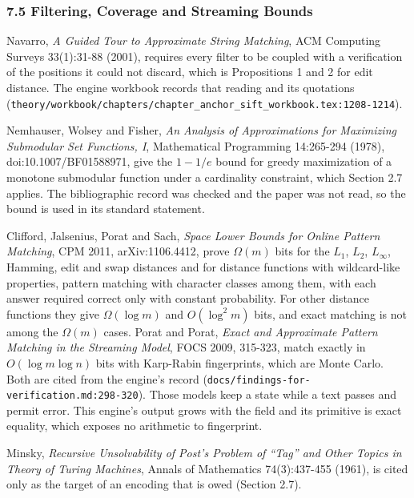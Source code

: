 \subsubsection{7.5 Filtering, Coverage and Streaming Bounds}

Navarro, \emph{A Guided Tour to Approximate String Matching}, ACM Computing Surveys 33(1):31-88 (2001), requires every filter to be coupled with a verification of the positions it could not discard, which is Propositions 1 and 2 for edit distance. The engine workbook records that reading and its quotations (\texttt{theory/\allowbreak{}workbook/\allowbreak{}chapters/\allowbreak{}chapter\_anchor\_sift\_workbook.tex:1208-\allowbreak{}1214}).

Nemhauser, Wolsey and Fisher, \emph{An Analysis of Approximations for Maximizing Submodular Set Functions, I}, Mathematical Programming 14:265-294 (1978), doi:10.1007/BF01588971, give the \(1 - 1/e\) bound for greedy maximization of a monotone submodular function under a cardinality constraint, which Section 2.7 applies. The bibliographic record was checked and the paper was not read, so the bound is used in its standard statement.

Clifford, Jalsenius, Porat and Sach, \emph{Space Lower Bounds for Online Pattern Matching}, CPM 2011, arXiv:1106.4412, prove \(\Omega(m)\) bits for the \(L_1\), \(L_2\), \(L_\infty\), Hamming, edit and swap distances and for distance functions with wildcard-like properties, pattern matching with character classes among them, with each answer required correct only with constant probability. For other distance functions they give \(\Omega(\log m)\) and \(O(\log^2 m)\) bits, and exact matching is not among the \(\Omega(m)\) cases. Porat and Porat, \emph{Exact and Approximate Pattern Matching in the Streaming Model}, FOCS 2009, 315-323, match exactly in \(O(\log m \log n)\) bits with Karp-Rabin fingerprints, which are Monte Carlo. Both are cited from the engine's record (\texttt{docs/\allowbreak{}findings-\allowbreak{}for-\allowbreak{}verification.md:298-\allowbreak{}320}). Those models keep a state while a text passes and permit error. This engine's output grows with the field and its primitive is exact equality, which exposes no arithmetic to fingerprint.

Minsky, \emph{Recursive Unsolvability of Post's Problem of ``Tag'' and Other Topics in Theory of Turing Machines}, Annals of Mathematics 74(3):437-455 (1961), is cited only as the target of an encoding that is owed (Section 2.7).


